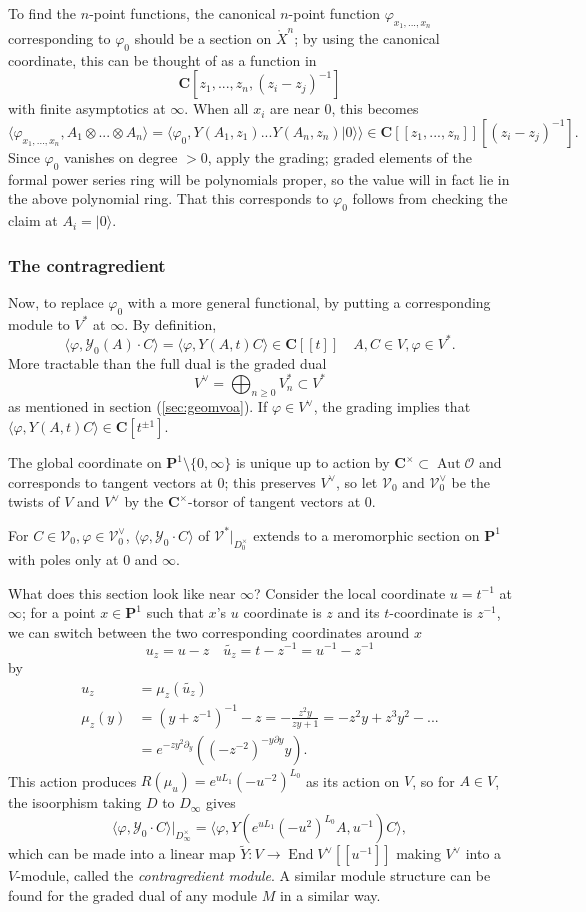 \documentclass{article}
\newcommand{\CC}{\mathbold{C}}
\newcommand{\PP}{\mathbold{P}}
\newcommand{\vac}{|0\rangle}
\newcommand{\Oo}{\mathcal{O}}
\newcommand{\Vv}{\mathcal{V}}
\newcommand{\Yy}{\mathcal{Y}}
\DeclareMathOperator{\End}{End}
\DeclareMathOperator{\Aut}{Aut}
\begin{document}
To find the $n$-point functions, the canonical $n$-point function $\varphi_{x_1,...,x_n}$ corresponding to $\varphi_0$ should be a section on $\mathring{X}^n$; by using the canonical coordinate, this can be thought of as a function in
\[\CC[z_1,...,z_n,(z_i-z_j)^{-1}] \]
with finite asymptotics at $\infty$.  When all $x_i$ are near $0$, this becomes
\[\langle \varphi_{x_1,...,x_n},A_1 \otimes ... \otimes A_n\rangle=\langle\varphi_0,Y(A_1,z_1)...Y(A_n,z_n)\vac \rangle \in \CC[[z_1,...,z_n]][(z_i-z_j)^{-1}].\]
Since $\varphi_0$ vanishes on degree $>0$, apply the grading; graded elements of the formal power series ring will be polynomials proper, so the value will in fact lie in the above polynomial ring.  That this corresponds to $\varphi_0$ follows from checking  the claim at $A_i=\vac$.

\subsubsection{The contragredient}
Now, to replace $\varphi_0$ with a more general functional, by putting a corresponding module to $V^*$ at $\infty$.  By definition,
\[\langle \varphi,\Yy_0(A) \cdot C\rangle=\langle \varphi, Y(A,t)C \rangle \in \CC[[t]] \quad A,C \in V, \varphi \in V^*. \]
More tractable than the full dual is the graded dual
\[V^\vee = \bigoplus_{n \ge 0}V_n^* \subset V^* \]
as mentioned in section (\ref{sec:geomvoa}).  If $\varphi \in V^\vee$, the grading implies that $\langle \varphi, Y(A,t)C \rangle \in \CC[t^{\pm 1}]$.

The global coordinate on $\PP^1 \setminus \{0,\infty\}$ is unique up to action by $\CC^\times \subset \Aut \Oo$ and corresponds to tangent vectors at $0$; this preserves $V^\vee$, so let $\Vv_0$ and $\Vv^\vee_0$ be the twists of $V$ and $V^\vee$ by the $\CC^\times$-torsor of tangent vectors at $0$.

For $C \in \Vv_0, \varphi \in \Vv^\vee_0$, $\langle \varphi, \Yy_0 \cdot C \rangle$ of $\Vv^*|_{D_0^\times}$ extends to a meromorphic section on $\PP^1$ with poles only at $0$ and $\infty$.

What does this section look like near $\infty$? Consider the local coordinate $u=t^{-1}$ at $\infty$; for a point $x \in \PP^1$ such that $x$'s $u$ coordinate is $z$ and its $t$-coordinate is $z^{-1}$, we can switch between the two corresponding coordinates around $x$
\[u_z=u-z \quad \widetilde{u_z}=t-z^{-1}=u^{-1}-z^{-1} \]
by
\begin{align}
  u_z&=\mu_z(\widetilde{u_z})\\
  \mu_z(y)&=(y+z^{-1})^{-1}-z=-\frac{z^2y}{zy+1}=-z^2y+z^3y^2-...\\
  &=e^{-zy^2\partial_y}((-z^{-2})^{-y\partial y}y).
\end{align}
This action produces $R(\mu_u)=e^{uL_1}(-u^{-2})^{L_0}$ as its action on $V$, so for $A \in V$, the isoorphism taking $D$ to $D_\infty$ gives
\[\langle \varphi,\Yy_0 \cdot C \rangle|_{D_\infty^\times}=\langle \varphi,Y(e^{uL_1}(-u^2)^{L_0}A,u^{-1})C \rangle, \]
which can be made into a linear map $\widetilde{Y}: V \rightarrow \End V^\vee[[u^{-1}]]$ making $V^\vee$ into a $V$-module, called the \textit{contragredient module}.  A similar module structure can be found for the graded dual of any module $M$ in a similar way.
\end{document}
